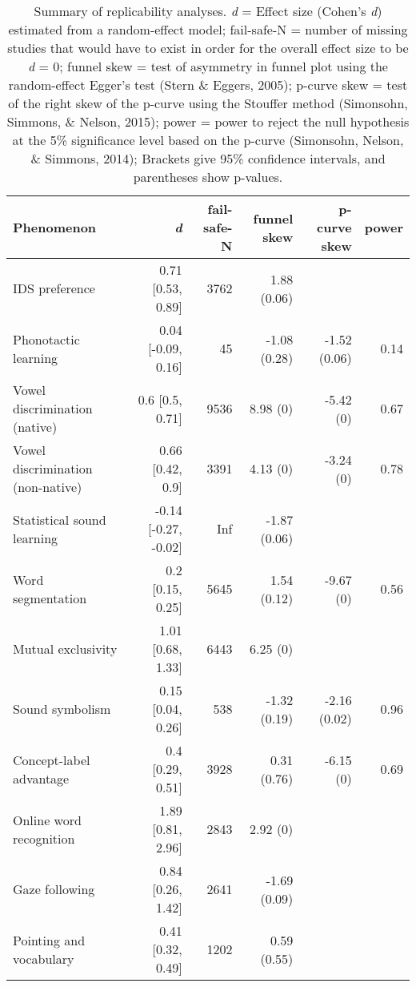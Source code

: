 \documentclass[american,floatsintext,man]{apa6}
\begin{document}
\begin{table}[t]
\footnotesize
\begin{tabular}{lrrrrr}
\toprule
\textbf{Phenomenon}& \textbf{\textit{d}} & \textbf{fail-safe-N} & \textbf{funnel skew} & \textbf{p-curve skew} & \textbf{power}\\
\midrule
IDS preference & 0.71 [0.53, 0.89] & 3762 & 1.88 (0.06) &  & \\
Phonotactic learning & 0.04 [-0.09, 0.16] & 45 & -1.08 (0.28) & -1.52 (0.06) & 0.14\\
Vowel discrimination (native) & 0.6 [0.5, 0.71] & 9536 & 8.98 (0) & -5.42 (0) & 0.67\\
Vowel discrimination (non-native) & 0.66 [0.42, 0.9] & 3391 & 4.13 (0) & -3.24 (0) & 0.78\\
Statistical sound learning & -0.14 [-0.27, -0.02] & Inf & -1.87 (0.06) &  & \\
Word segmentation & 0.2 [0.15, 0.25] & 5645 & 1.54 (0.12) & -9.67 (0) & 0.56\\
Mutual exclusivity & 1.01 [0.68, 1.33] & 6443 & 6.25 (0) &  & \\
Sound symbolism & 0.15 [0.04, 0.26] & 538 & -1.32 (0.19) & -2.16 (0.02) & 0.96\\
Concept-label advantage & 0.4 [0.29, 0.51] & 3928 & 0.31 (0.76) & -6.15 (0) & 0.69\\
Online word recognition & 1.89 [0.81, 2.96] & 2843 & 2.92 (0) &  & \\
Gaze following & 0.84 [0.26, 1.42] & 2641 & -1.69 (0.09) &  & \\
Pointing and vocabulary & 0.41 [0.32, 0.49] & 1202 & 0.59 (0.55) &  & \\
\bottomrule
\end{tabular}
\caption{Summary of replicability analyses. \textit{d} = Effect size (Cohen's {\it d}) estimated from a random-effect model; fail-safe-N = number of missing studies that would have to exist in order for the overall effect size to be {\it d} = 0; funnel skew = test of asymmetry in funnel plot using the random-effect Egger's test (Stern \& Eggers, 2005); p-curve skew = test of the right skew of the p-curve using the Stouffer method (Simonsohn, Simmons, \& Nelson, 2015); power = power to reject the null hypothesis at the 5\% significance level based on the p-curve (Simonsohn, Nelson, \& Simmons, 2014);  Brackets give 95\% confidence intervals, and parentheses show p-values.}
\end{table}
\end{document}
